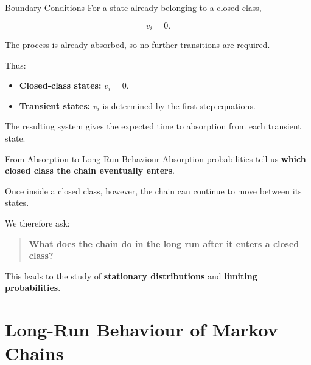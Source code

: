 \documentclass[
  ignorenonframetext,
  aspectratio=169,
]{beamer}
\providecommand{\tightlist}{%
  \setlength{\itemsep}{0pt}\setlength{\parskip}{0pt}}
\begin{document}
\begin{frame}{Boundary Conditions}
\protect{}\label{boundary-conditions-1}
For a state already belonging to a closed class,

\[
\boxed{v_i=0.}
\]

The process is already absorbed, so no further transitions are required.

Thus:

\begin{itemize}
\tightlist
\item
  \textbf{Closed-class states:} \(v_i=0\).
\item
  \textbf{Transient states:} \(v_i\) is determined by the first-step
  equations.
\end{itemize}

The resulting system gives the expected time to absorption from each
transient state.
\end{frame}

\begin{frame}{From Absorption to Long-Run Behaviour}
\protect{}\label{from-absorption-to-long-run-behaviour}
Absorption probabilities tell us \textbf{which closed class the chain
eventually enters}.

Once inside a closed class, however, the chain can continue to move
between its states.

We therefore ask:

\begin{quote}
\textbf{What does the chain do in the long run after it enters a closed
class?}
\end{quote}

This leads to the study of \textbf{stationary distributions} and
\textbf{limiting probabilities}.
\end{frame}

\section{Long-Run Behaviour of Markov
Chains}\label{long-run-behaviour-of-markov-chains}
\end{document}
